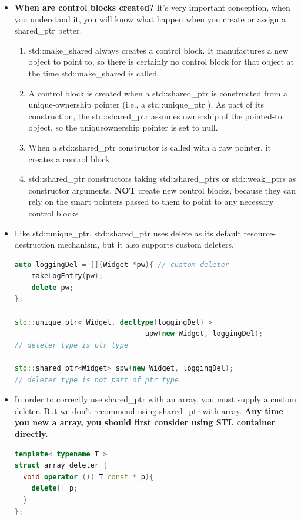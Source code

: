 \documentclass[a4paper,11pt,twoside]{book}
\begin{document}
\begin{itemize}
\item \textbf{When are control blocks created?}  It's very important conception, when you understand it, you will know what happen when you create or assign a shared\_ptr better. 
		
\begin{enumerate}
\item std::make\_shared  always creates a control block. It manufactures
a new object to point to, so there is certainly no control block for that
object at the time std::make\_shared is called.

\item A control block is created when a std::shared\_ptr is constructed from a
unique-ownership pointer (i.e., a std::unique\_ptr ). As part of its construction, the std::shared\_ptr assumes ownership of the pointed-to object, so the uniqueownership pointer is set to null.

\item When a std::shared\_ptr constructor is called with a raw pointer, it creates a control block.

\item std::shared\_ptr constructors taking std::shared\_ptrs or std::weak\_ptrs as constructor arguments. \textbf{NOT} create new control blocks, because they can rely on the smart pointers passed to them to point to any necessary control blocks

\end{enumerate}


\item Like std::unique\_ptr, std::shared\_ptr uses delete as its default resource-destruction mechanism, but it also supports custom deleters.
\begin{lstlisting}[frame=single, language=c++]
auto loggingDel = [](Widget *pw){ // custom deleter
	makeLogEntry(pw);
	delete pw;
};

std::unique_ptr< Widget, decltype(loggingDel) >
                               upw(new Widget, loggingDel);
// deleter type is ptr type

std::shared_ptr<Widget> spw(new Widget, loggingDel);
// deleter type is not part of ptr type
\end{lstlisting}

\item In order to correctly use shared\_ptr with an array, you must supply a custom deleter. But we don't recommend using shared\_ptr with array. \textbf{Any time you new a array, you should first consider using STL container directly.}
\begin{lstlisting}[frame=single, language=c++]
template< typename T >
struct array_deleter {
  void operator ()( T const * p){
    delete[] p;
  }
};


\end{lstlisting}
\end{itemize}
\end{document}
